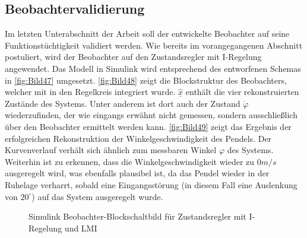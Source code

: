 \subsection{Beobachtervalidierung}

Im letzten Unterabschnitt der Arbeit soll der entwickelte Beobachter auf seine Funktionstüchtigkeit validiert werden. Wie bereits im vorangegangenen Abschnitt postuliert, wird der Beobachter auf den Zustandsregler mit I-Regelung angewendet. Das Modell in Simulink wird entsprechend des entworfenen Schemas in \autoref{fig:Bild47} umgesetzt. \autoref{fig:Bild48} zeigt die Blockstruktur des Beobachters, welcher mit in den Regelkreis integriert wurde. $\underline{\hat{x}}$ enthält die vier rekonstruierten Zustände des Systems. Unter anderem ist dort auch der Zustand $\dot{\varphi}$ wiederzufinden, der wie eingangs erwähnt nicht gemessen, sondern ausschließlich über den Beobachter ermittelt werden kann. \autoref{fig:Bild49} zeigt das Ergebnis der erfolgreichen Rekonstruktion der Winkelgeschwindigkeit des Pendels. Der Kurvenverlauf verhält sich ähnlich zum messbaren Winkel $\varphi$ des Systems. Weiterhin ist zu erkennen, dass die Winkelgeschwindigkeit wieder zu $0 m/s$ ausgeregelt wird, was ebenfalls plausibel ist, da das Pendel wieder in der Ruhelage verharrt, sobald eine Eingangsstörung (in diesem Fall eine Auslenkung von $20^\circ$) auf das System ausgeregelt wurde.

\begin{figure}[H]
    \centering
    \caption[Beobachter Simulink]{Simulink Beobachter-Blockschaltbild für Zustandsregler mit I-Regelung und LMI}
    \label{fig:Bild48}
\end{figure}

